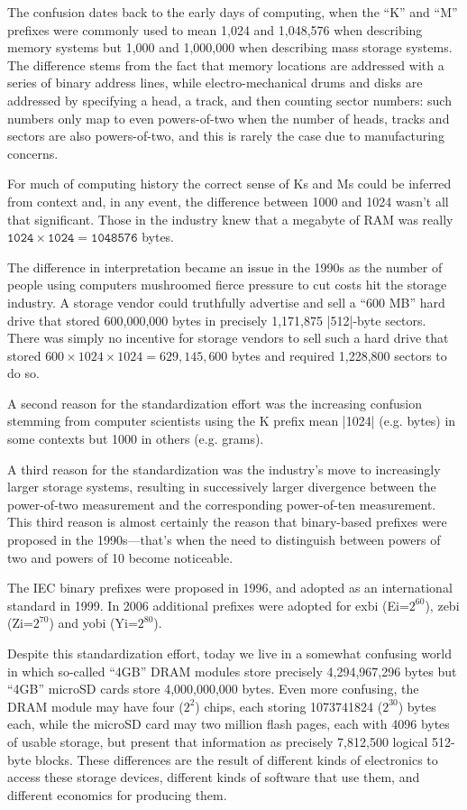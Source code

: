 The confusion dates back to the early days of computing, when the ``K''
and ``M'' prefixes were commonly used to mean 1,024 and 1,048,576
when describing memory systems but 1,000 and 1,000,000 when
describing mass storage systems. The difference stems
from the fact that memory locations are  addressed
with a series of binary address lines, while electro-mechanical drums and
disks are addressed by specifying a head, a track, and then counting
sector numbers: such numbers only map to even powers-of-two when the
number of heads, tracks and sectors are also powers-of-two, and
this is rarely the case due to manufacturing concerns.

For much of computing history the correct sense of Ks and Ms could be
inferred from context and, in any event, the difference between 1000
and 1024 wasn't all that significant. Those in the industry knew that
a megabyte of RAM was really $\texttt{1024}\times\texttt{1024}=\texttt{1048576}$ bytes.

The difference in interpretation became an issue in the 1990s as the
number of people using computers mushroomed fierce pressure to cut
costs hit the storage industry. A storage vendor could truthfully
advertise and sell a ``600 MB''
hard drive that stored 600,000,000 bytes in
precisely 1,171,875 |512|-byte sectors. There was simply no incentive
for storage vendors to sell such a hard drive that stored
$600\times1024\times1024=629,145,600$ bytes and required 1,228,800
sectors to do so.

A second reason for the standardization effort was the increasing
confusion stemming from computer scientists using the K prefix
mean |1024| (e.g. bytes) in some contexts but 1000 in others (e.g. grams). 

A third reason for the standardization was the industry's move to
increasingly larger storage systems, resulting in successively larger
divergence between the power-of-two measurement and the corresponding
power-of-ten measurement. This third reason is almost certainly the
reason that binary-based prefixes were proposed in the 1990s---that's
when the need to distinguish between powers of two and powers of 10 become noticeable.

The IEC binary prefixes were proposed in 1996\cite{iec:1996}, and
adopted as an international standard in 1999.  In 2006 additional
prefixes were adopted for exbi (Ei=$2^{60}$), zebi (Zi=$2^{70}$) and
yobi (Yi=$2^{80}$)\cite{iec:80000-13:2008}.

Despite this standardization effort, today we live in a somewhat
confusing world in which so-called ``4GB'' DRAM modules 
store precisely 4,294,967,296 bytes
but ``4GB'' microSD cards store 4,000,000,000 bytes. Even more confusing, the DRAM
module may have four ($2^{2}$) chips, each storing 1073741824
($2^{30}$) bytes each, while the microSD card may two million flash
pages, each with 4096 bytes of usable storage, but present that
information as precisely 7,812,500 logical 512-byte blocks.  These
differences are the result of different kinds of electronics to access
these storage devices, different kinds of software that use them, and
different economics for producing them. 

